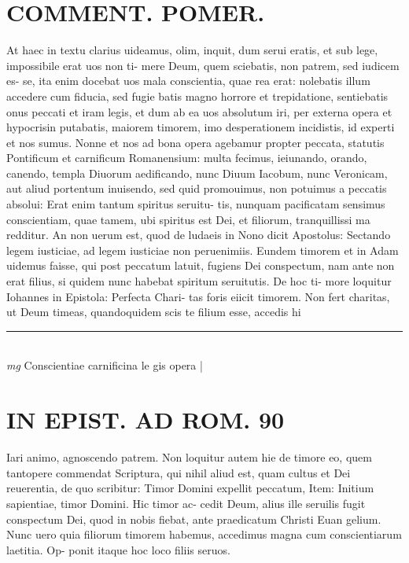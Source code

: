 \documentclass{article}
\begin{document}
\begin{pages}
\section*{COMMENT. POMER.  }\pstart At haec in textu clarius uideamus, olim, inquit, dum serui eratis, et sub lege, impossibile erat uos non ti- mere Deum, quem sciebatis, non patrem, sed iudicem es- se, ita enim docebat uos mala conscientia, quae rea erat: nolebatis illum accedere cum fiducia, sed fugie batis magno horrore et trepidatione, sentiebatis onus peccati et iram legis, et dum ab ea uos absolutum iri, per externa opera et hypocrisin putabatis, maiorem timorem, imo desperationem incidistis, id experti et nos sumus. Nonne et nos ad bona opera agebamur propter peccata, statutis Pontificum et carnificum Romanensium: multa fecimus, ieiunando, orando, canendo, templa Diuorum aedificando, nunc Diuum Iacobum, nunc Veronicam, aut aliud portentum inuisendo, sed quid promouimus, non potuimus a peccatis absolui: Erat enim tantum spiritus seruitu- tis, nunquam pacificatam sensimus conscientiam, quae tamem, ubi spiritus est Dei, et filiorum, tranquillissi ma redditur. An non uerum est, quod de ludaeis in Nono dicit Apostolus: Sectando legem iusticiae, ad legem iusticiae non peruenimiis. Eundem timorem et in Adam uidemus faisse, qui post peccatum latuit, fugiens Dei conspectum, nam ante non erat filius, si quidem nunc habebat spiritum seruitutis. De hoc ti- more loquitur Iohannes in Epistola: Perfecta Chari- tas foris eiicit timorem. Non fert charitas, ut Deum timeas, quandoquidem scis te filium esse, accedis hi  \pend
\vspace{0.5cm}\noindent
\vspace{0.2cm}\rule{1cm}{0.2pt}\\ 
\hspace{0.2cm}\textit{mg}
\footnotesize Conscientiae carnificina le gis opera 
\normalsize| 
\section*{IN EPIST. AD ROM.  90 }
\marginpar{[ p.]}\pstart Iari animo, agnoscendo patrem. Non loquitur autem hie de timore eo, quem tantopere commendat Scriptura, qui nihil aliud est, quam cultus et Dei reuerentia, de quo scribitur: Timor Domini expellit peccatum, Item: Initium sapientiae, timor Domini. Hic timor ac- cedit Deum, alius ille seruilis fugit conspectum Dei, quod in nobis fiebat, ante praedicatum Christi Euan gelium. Nunc uero quia filiorum timorem habemus, accedimus magna cum conscientiarum laetitia. Op- ponit itaque hoc loco filiis seruos.  \pend
{}
{}

\end{pages}
\end{document}
